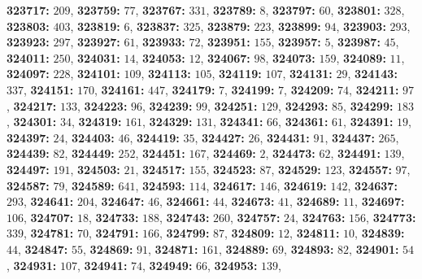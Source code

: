 \textsf{\bfseries 323717:} $209$, \textsf{\bfseries 323759:} $77$, \textsf{\bfseries 323767:} $331$, \textsf{\bfseries 323789:} $8$, \textsf{\bfseries 323797:} $60$, \textsf{\bfseries 323801:} $328$, \textsf{\bfseries 323803:} $403$, \textsf{\bfseries 323819:} $6$, \textsf{\bfseries 323837:} $325$, \textsf{\bfseries 323879:} $223$, \textsf{\bfseries 323899:} $94$, \textsf{\bfseries 323903:} $293$, \textsf{\bfseries 323923:} $297$, \textsf{\bfseries 323927:} $61$, \textsf{\bfseries 323933:} $72$, \textsf{\bfseries 323951:} $155$, \textsf{\bfseries 323957:} $5$, \textsf{\bfseries 323987:} $45$, \textsf{\bfseries 324011:} $250$, \textsf{\bfseries 324031:} $14$, \textsf{\bfseries 324053:} $12$, \textsf{\bfseries 324067:} $98$, \textsf{\bfseries 324073:} $159$, \textsf{\bfseries 324089:} $11$, \textsf{\bfseries 324097:} $228$, \textsf{\bfseries 324101:} $109$, \textsf{\bfseries 324113:} $105$, \textsf{\bfseries 324119:} $107$, \textsf{\bfseries 324131:} $29$, \textsf{\bfseries 324143:} $337$, \textsf{\bfseries 324151:} $170$, \textsf{\bfseries 324161:} $447$, \textsf{\bfseries 324179:} $7$, \textsf{\bfseries 324199:} $7$, \textsf{\bfseries 324209:} $74$, \textsf{\bfseries 324211:} $97$, \textsf{\bfseries 324217:} $133$, \textsf{\bfseries 324223:} $96$, \textsf{\bfseries 324239:} $99$, \textsf{\bfseries 324251:} $129$, \textsf{\bfseries 324293:} $85$, \textsf{\bfseries 324299:} $183$, \textsf{\bfseries 324301:} $34$, \textsf{\bfseries 324319:} $161$, \textsf{\bfseries 324329:} $131$, \textsf{\bfseries 324341:} $66$, \textsf{\bfseries 324361:} $61$, \textsf{\bfseries 324391:} $19$, \textsf{\bfseries 324397:} $24$, \textsf{\bfseries 324403:} $46$, \textsf{\bfseries 324419:} $35$, \textsf{\bfseries 324427:} $26$, \textsf{\bfseries 324431:} $91$, \textsf{\bfseries 324437:} $265$, \textsf{\bfseries 324439:} $82$, \textsf{\bfseries 324449:} $252$, \textsf{\bfseries 324451:} $167$, \textsf{\bfseries 324469:} $2$, \textsf{\bfseries 324473:} $62$, \textsf{\bfseries 324491:} $139$, \textsf{\bfseries 324497:} $191$, \textsf{\bfseries 324503:} $21$, \textsf{\bfseries 324517:} $155$, \textsf{\bfseries 324523:} $87$, \textsf{\bfseries 324529:} $123$, \textsf{\bfseries 324557:} $97$, \textsf{\bfseries 324587:} $79$, \textsf{\bfseries 324589:} $641$, \textsf{\bfseries 324593:} $114$, \textsf{\bfseries 324617:} $146$, \textsf{\bfseries 324619:} $142$, \textsf{\bfseries 324637:} $293$, \textsf{\bfseries 324641:} $204$, \textsf{\bfseries 324647:} $46$, \textsf{\bfseries 324661:} $44$, \textsf{\bfseries 324673:} $41$, \textsf{\bfseries 324689:} $11$, \textsf{\bfseries 324697:} $106$, \textsf{\bfseries 324707:} $18$, \textsf{\bfseries 324733:} $188$, \textsf{\bfseries 324743:} $260$, \textsf{\bfseries 324757:} $24$, \textsf{\bfseries 324763:} $156$, \textsf{\bfseries 324773:} $339$, \textsf{\bfseries 324781:} $70$, \textsf{\bfseries 324791:} $166$, \textsf{\bfseries 324799:} $87$, \textsf{\bfseries 324809:} $12$, \textsf{\bfseries 324811:} $10$, \textsf{\bfseries 324839:} $44$, \textsf{\bfseries 324847:} $55$, \textsf{\bfseries 324869:} $91$, \textsf{\bfseries 324871:} $161$, \textsf{\bfseries 324889:} $69$, \textsf{\bfseries 324893:} $82$, \textsf{\bfseries 324901:} $54$, \textsf{\bfseries 324931:} $107$, \textsf{\bfseries 324941:} $74$, \textsf{\bfseries 324949:} $66$, \textsf{\bfseries 324953:} $139$, 
